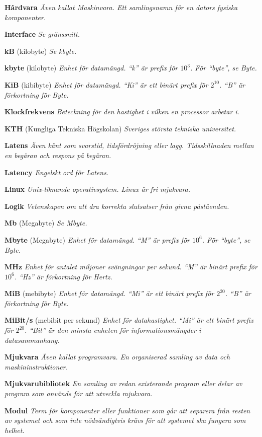 \documentclass[a4paper, twoside, 11pt, titlepage]{article}
\begin{document}
	\textbf{Hårdvara} \emph{Även kallat Maskinvara. Ett samlingsnamn för en dators fysiska komponenter.}

	\textbf{Interface} \emph{Se gränssnitt.}

	\textbf{kB} (kilobyte) \emph{Se kbyte.}

	\textbf{kbyte} (kilobyte) \emph{Enhet för datamängd. ``k'' är prefix för $10^{3}$. För ``byte'', se Byte.}

	\textbf{KiB} (kibibyte) \emph{Enhet för datamängd. ``Ki'' är ett binärt prefix för $2^{10}$. ``B'' är förkortning för Byte.}

	\textbf{Klockfrekvens} \emph{Beteckning för den hastighet i vilken en processor arbetar i.}

	\textbf{KTH} (Kungliga Tekniska Högskolan) \emph{Sveriges största tekniska universitet.}

	\textbf{Latens} \emph{Även känt som svarstid, tidsfördröjning eller lagg. Tidsskillnaden mellan en begäran och respons på begäran.}

	\textbf{Latency} \emph{Engelskt ord för Latens.}

	\textbf{Linux} \emph{Unix-liknande operativsystem. Linux är fri mjukvara.}

	\textbf{Logik} \emph{Vetenskapen om att dra korrekta slutsatser från givna påståenden.}

	\textbf{Mb} (Megabyte) \emph{Se Mbyte.}

	\textbf{Mbyte} (Megabyte) \emph{Enhet för datamängd. ``M'' är prefix för $10^{6}$.  För ``byte'', se Byte.}

	\textbf{MHz} \emph{Enhet för antalet miljoner svängningar per sekund. ``M'' är binärt prefix för $10^{6}$. ``Hz'' är förkortning för Hertz.}

	\textbf{MiB} (mebibyte) \emph{Enhet för datamängd. ``Mi'' är ett binärt prefix för $2^{20}$. ``B'' är förkortning för Byte.}

	\textbf{MiBit/s} (mebibit per sekund) \emph{Enhet för datahastighet. ``Mi'' är ett binärt prefix för $2^{20}$. ``Bit'' är den minsta enheten för informationsmängder i datasammanhang.}

	\textbf{Mjukvara} \emph{Även kallat programvara. En organiserad samling av data och maskininstruktioner.}

	\textbf{Mjukvarubibliotek} \emph{En samling av redan existerande program eller delar av program som används för att utveckla mjukvara.}

	\textbf{Modul} \emph{Term för komponenter eller funktioner som går att separera från resten av systemet och som inte nödvändigtvis krävs för att systemet ska fungera som helhet.}
\end{document}
